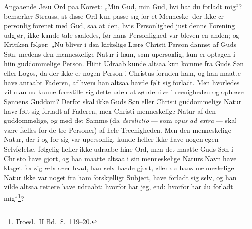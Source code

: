 \documentclass[12pt]{book}
\begin{document}
Angaaende Jesu Ord paa Korset: „Min Gud, min Gud, hvi har du forladt
mig“? bemærker Strauss, at disse Ord kun passe sig for et Menneske,
der ikke er personlig forenet med Gud, saa at den, hvis
Personlighed just denne Forening udgjør, ikke kunde tale saaledes,
før hans Personlighed var bleven en anden; og Kritiken følger: „Nu
bliver i den kirkelige Lære Christi Person dannet af Guds Søn,
medens den menneskelige Natur i ham, som upersonlig, kun er optagen
i hiin guddommelige Person. Hiint Udraab kunde altsaa kun komme fra
Guds Søn eller Logos, da der ikke er nogen Person i Christus foruden
ham, og han maatte have anraabt Faderen, af hvem han altsaa havde
følt sig forladt. Men hvorledes vil man nu kunne forestille sig
dette uden at sønderrive Treenigheden og ophæve Sønnens Guddom?
Derfor skal ikke Guds Søn eller Christi guddommelige Natur have følt
sig forladt af Faderen, men Christi menneskelige Natur af den
guddommelige, og med det Samme (da \textit{derelictio} --- som
\textit{opus ad extra} --- skal være fælles for de tre Personer) af
hele Treenigheden. Men den menneskelige Natur, der i og for sig var
upersonlig, kunde heller ikke have nogen egen Selvfølelse, følgelig
heller ikke udraabe
hine Ord, men det maatte Guds Søn i Christo have gjort, og han
maatte altsaa i sin menneskelige Naturs Navn have klaget for sig
selv over hvad, han selv havde gjort, eller da hans menneskelige
Natur ikke var noget fra ham forskjelligt Subject, have forladt sig
selv, og han vilde altsaa rettere have udraabt: hvorfor har jeg,
end: hvorfor har du forladt mig“\footnote{Troesl.\ II Bd.\
S.\ 119--20.}?
\end{document}
